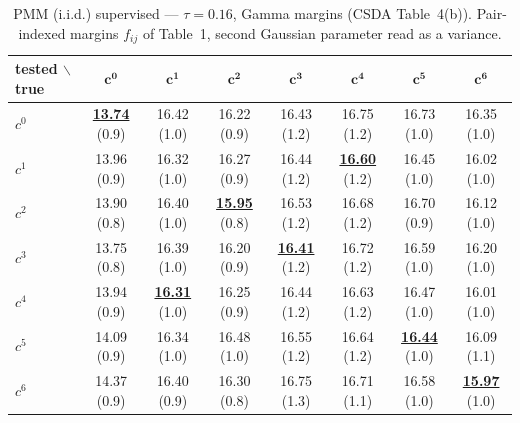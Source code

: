 \begin{table}[htbp]
  \centering
  \small
  \setlength{\tabcolsep}{4pt}
  \caption{PMM (i.i.d.) supervised — $\tau = 0.16$, Gamma margins (CSDA Table~4(b)). Pair-indexed margins $f_{ij}$ of Table~1, second Gaussian parameter read as a variance.}
  \label{tab:exp2-low_tau_gamma}
  \begin{tabular}{lccccccc}
    \toprule
    tested $\backslash$ true & $\mathbf{c^{0}}$ & $\mathbf{c^{1}}$ & $\mathbf{c^{2}}$ & $\mathbf{c^{3}}$ & $\mathbf{c^{4}}$ & $\mathbf{c^{5}}$ & $\mathbf{c^{6}}$ \\
    \midrule
    $c^{0}$ & \textbf{\underline{13.74}} (0.9) & 16.42 (1.0) & 16.22 (0.9) & 16.43 (1.2) & 16.75 (1.2) & 16.73 (1.0) & 16.35 (1.0) \\
    $c^{1}$ & 13.96 (0.9) & 16.32 (1.0) & 16.27 (0.9) & 16.44 (1.2) & \textbf{\underline{16.60}} (1.2) & 16.45 (1.0) & 16.02 (1.0) \\
    $c^{2}$ & 13.90 (0.8) & 16.40 (1.0) & \textbf{\underline{15.95}} (0.8) & 16.53 (1.2) & 16.68 (1.2) & 16.70 (0.9) & 16.12 (1.0) \\
    $c^{3}$ & 13.75 (0.8) & 16.39 (1.0) & 16.20 (0.9) & \textbf{\underline{16.41}} (1.2) & 16.72 (1.2) & 16.59 (1.0) & 16.20 (1.0) \\
    $c^{4}$ & 13.94 (0.9) & \textbf{\underline{16.31}} (1.0) & 16.25 (0.9) & 16.44 (1.2) & 16.63 (1.2) & 16.47 (1.0) & 16.01 (1.0) \\
    $c^{5}$ & 14.09 (0.9) & 16.34 (1.0) & 16.48 (1.0) & 16.55 (1.2) & 16.64 (1.2) & \textbf{\underline{16.44}} (1.0) & 16.09 (1.1) \\
    $c^{6}$ & 14.37 (0.9) & 16.40 (0.9) & 16.30 (0.8) & 16.75 (1.3) & 16.71 (1.1) & 16.58 (1.0) & \textbf{\underline{15.97}} (1.0) \\
    \bottomrule
  \end{tabular}
\end{table}
